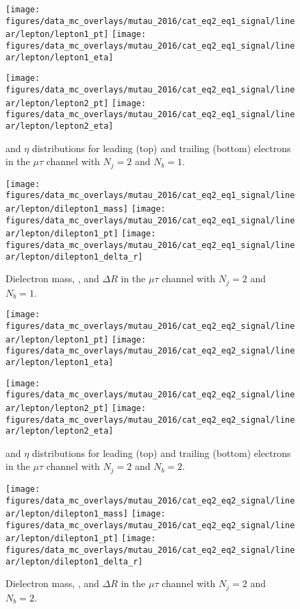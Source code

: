 \begin{figure}[htb!]
    \centering
    \texttt{[image: figures/data\_mc\_overlays/mutau\_2016/cat\_eq2\_eq1\_signal/linear/lepton/lepton1\_pt]}
    \texttt{[image: figures/data\_mc\_overlays/mutau\_2016/cat\_eq2\_eq1\_signal/linear/lepton/lepton1\_eta]}

    \texttt{[image: figures/data\_mc\_overlays/mutau\_2016/cat\_eq2\_eq1\_signal/linear/lepton/lepton2\_pt]}
    \texttt{[image: figures/data\_mc\_overlays/mutau\_2016/cat\_eq2\_eq1\_signal/linear/lepton/lepton2\_eta]}
    \caption{\pt and $\eta$ distributions for leading (top) and trailing
        (bottom) electrons in the $\mu\tau$ channel with $N_{j} = 2$ and
        $N_{b} = 1$.}
    \label{fig:mutau_5_kinematic}
\end{figure}

\begin{figure}[htb!]
    \centering
    \texttt{[image: figures/data\_mc\_overlays/mutau\_2016/cat\_eq2\_eq1\_signal/linear/lepton/dilepton1\_mass]}
    \texttt{[image: figures/data\_mc\_overlays/mutau\_2016/cat\_eq2\_eq1\_signal/linear/lepton/dilepton1\_pt]}
    \texttt{[image: figures/data\_mc\_overlays/mutau\_2016/cat\_eq2\_eq1\_signal/linear/lepton/dilepton1\_delta\_r]}
    \caption{Dielectron mass, \pt, and $\Delta R$ in the $\mu\tau$ channel
    with $N_{j} = 2$ and $N_{b} = 1$.}
    \label{fig:mutau_5_dilepton}
\end{figure}

\begin{figure}[htb!]
    \centering
    \texttt{[image: figures/data\_mc\_overlays/mutau\_2016/cat\_eq2\_eq2\_signal/linear/lepton/lepton1\_pt]}
    \texttt{[image: figures/data\_mc\_overlays/mutau\_2016/cat\_eq2\_eq2\_signal/linear/lepton/lepton1\_eta]}

    \texttt{[image: figures/data\_mc\_overlays/mutau\_2016/cat\_eq2\_eq2\_signal/linear/lepton/lepton2\_pt]}
    \texttt{[image: figures/data\_mc\_overlays/mutau\_2016/cat\_eq2\_eq2\_signal/linear/lepton/lepton2\_eta]}
    \caption{\pt and $\eta$ distributions for leading (top) and trailing
        (bottom) electrons in the $\mu\tau$ channel with $N_{j} = 2$ and
        $N_{b} = 2$.}
    \label{fig:mutau_6_kinematic}
\end{figure}

\begin{figure}[htb!]
    \centering
    \texttt{[image: figures/data\_mc\_overlays/mutau\_2016/cat\_eq2\_eq2\_signal/linear/lepton/dilepton1\_mass]}
    \texttt{[image: figures/data\_mc\_overlays/mutau\_2016/cat\_eq2\_eq2\_signal/linear/lepton/dilepton1\_pt]}
    \texttt{[image: figures/data\_mc\_overlays/mutau\_2016/cat\_eq2\_eq2\_signal/linear/lepton/dilepton1\_delta\_r]}
    \caption{Dielectron mass, \pt, and $\Delta R$ in the $\mu\tau$ channel
    with $N_{j} = 2$ and $N_{b} = 2$.}
    \label{fig:mutau_6_dilepton}
\end{figure}


